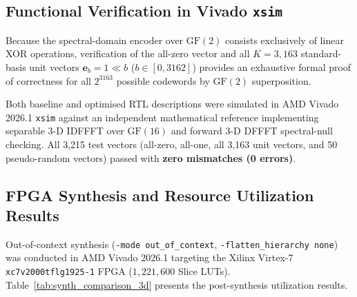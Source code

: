 \documentclass[journal]{IEEEtran}
\begin{document}
\begin{table}[htbp]
\caption{3-D Computation-Class Multiplier Bank Breakdown ($N=15, T=2$)}
\label{tab:comp_classes_3d}
\centering
{}
\end{table}

\subsection{Functional Verification in Vivado \texttt{xsim}}
Because the spectral-domain encoder over $\text{GF}(2)$ consists exclusively of linear XOR operations, verification of the all-zero vector and all $K=3,163$ standard-basis unit vectors $\mathbf{e}_b = 1 \ll b$ ($b \in [0, 3162]$) provides an exhaustive formal proof of correctness for all $2^{3163}$ possible codewords by $\text{GF}(2)$ superposition.

Both baseline and optimised RTL descriptions were simulated in AMD Vivado 2026.1 \texttt{xsim} against an independent mathematical reference implementing separable 3-D IDFFFT over $\text{GF}(16)$ and forward 3-D DFFFT spectral-null checking. All 3,215 test vectors (all-zero, all-one, all 3,163 unit vectors, and 50 pseudo-random vectors) passed with \textbf{zero mismatches (0 errors)}.

\subsection{FPGA Synthesis and Resource Utilization Results}
Out-of-context synthesis (\texttt{-mode out\_of\_context}, \texttt{-flatten\_hierarchy none}) was conducted in AMD Vivado 2026.1 targeting the Xilinx Virtex-7 \texttt{xc7v2000tflg1925-1} FPGA ($1,221,600$ Slice LUTs). Table~\ref{tab:synth_comparison_3d} presents the post-synthesis utilization results.
\end{document}
